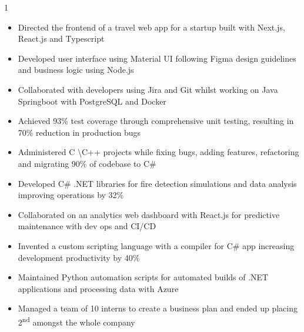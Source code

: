 \documentclass[11pt,a4paper,ragged2e]{altacv}
\begin{document}
\begin{paracol}{1}
\begin{itemize}
\item Directed the frontend of a travel web app for a startup built with Next.js, React.js and Typescript
\item Developed user interface using Material UI following Figma design guidelines and business logic using Node.js
\item Collaborated with developers using Jira and Git whilst working on Java Springboot with PostgreSQL and Docker
\item Achieved 93\% test coverage through comprehensive unit testing, resulting in 70\% reduction in production bugs
\end{itemize}
\tightdivider

\begin{itemize}
\item Administered C \textbackslash C++ projects while fixing bugs, adding features, refactoring and migrating 90\% of codebase to C\#
\item Developed C\# .NET libraries for fire detection simulations and data analysis improving operations by 32\%
\item Collaborated on an analytics web dashboard with React.js for predictive maintenance with dev ops and CI/CD
\item Invented a custom scripting language with a compiler for C\# app increasing development productivity by 40\%
\item Maintained Python automation scripts for automated builds of .NET applications and processing data with Azure
\item Managed a team of 10 interns to create a business plan and ended up placing  2\textsuperscript{nd} amongst the whole company
\end{itemize}
\tightdivider


\end{paracol}
\end{document}
